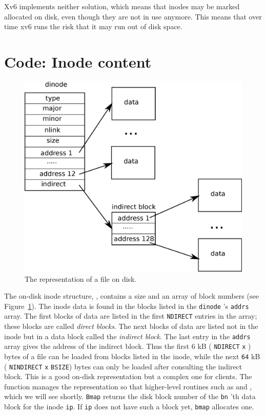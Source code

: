 Xv6 implements neither solution, which means that inodes may be marked allocated
on disk, even though they are not in use anymore.  This means that over time xv6
runs the risk that it may run out of disk space.
\section{Code: Inode content}

\begin{figure}[t]
\center
\includegraphics[scale=0.5]{fig/inode.eps}
\caption{The representation of a file on disk.}
\label{fig:inode}
\end{figure}

The on-disk inode structure,
,
contains a size and an array of block numbers (see 
Figure~\ref{fig:inode}).
The inode data is found in the blocks listed
in the
\lstinline{dinode} 's
\lstinline{addrs}
array.
The first
blocks of data are listed in the first
\lstinline{NDIRECT}
entries in the array; these blocks are called 
\textit{direct blocks}.
The next 
blocks of data are listed not in the inode
but in a data block called the
\textit{indirect block}.
The last entry in the
\lstinline{addrs}
array gives the address of the indirect block.
Thus the first 6 kB (
\lstinline{NDIRECT} 
\lstinline{x}
)
bytes of a file can be loaded from blocks listed in the inode,
while the next
\lstinline{64} kB (
\lstinline{NINDIRECT}
\lstinline{x}
\lstinline{BSIZE})
bytes can only be loaded after consulting the indirect block.
This is a good on-disk representation but a 
complex one for clients.
The function
manages the representation so that higher-level routines such as
and
,
which we will see shortly.
\lstinline{Bmap}
returns the disk block number of the
\lstinline{bn} 'th
data block for the inode
\lstinline{ip}.
If
\lstinline{ip}
does not have such a block yet,
\lstinline{bmap}
allocates one.

